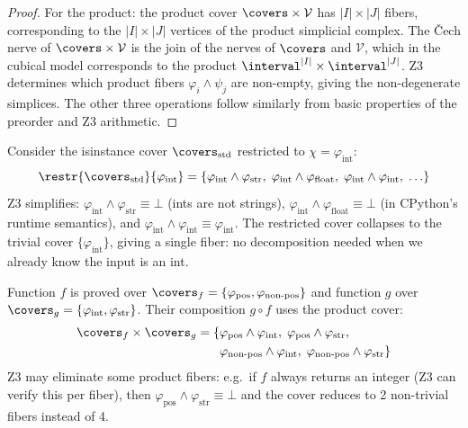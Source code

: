 \begin{proof}
For the product: the product cover $\covers \times \mathcal{V}$ has
$|I| \times |J|$ fibers, corresponding to the $|I| \times |J|$ vertices
of the product simplicial complex.  The \v{C}ech nerve of
$\covers \times \mathcal{V}$ is the join of the nerves of $\covers$ and
$\mathcal{V}$, which in the cubical model corresponds to the product
$\interval^{|I|} \times \interval^{|J|}$.  Z3 determines which product
fibers $\varphi_i \wedge \psi_j$ are non-empty, giving the non-degenerate
simplices.  The other three operations follow similarly from basic
properties of the preorder and Z3 arithmetic.
\end{proof}

\begin{example}
\label{ex:cover-restriction}
Consider the isinstance cover $\covers_{\mathrm{std}}$ restricted to
$\chi = \varphi_{\mathrm{int}}$:
\[
  \restr{\covers_{\mathrm{std}}}{\varphi_{\mathrm{int}}}
  = \{\varphi_{\mathrm{int}} \wedge \varphi_{\mathrm{str}},\;
    \varphi_{\mathrm{int}} \wedge \varphi_{\mathrm{float}},\;
    \varphi_{\mathrm{int}} \wedge \varphi_{\mathrm{int}},\;\ldots\}
\]
Z3 simplifies: $\varphi_{\mathrm{int}} \wedge \varphi_{\mathrm{str}} \equiv
\bot$ (ints are not strings), $\varphi_{\mathrm{int}} \wedge
\varphi_{\mathrm{float}} \equiv \bot$ (in CPython's runtime semantics),
and $\varphi_{\mathrm{int}} \wedge \varphi_{\mathrm{int}} \equiv
\varphi_{\mathrm{int}}$.  The restricted cover collapses to the trivial
cover $\{\varphi_{\mathrm{int}}\}$, giving a single fiber: no
decomposition needed when we already know the input is an int.
\end{example}

\begin{example}
\label{ex:product-cover}
Function $f$ is proved over
$\covers_f = \{\varphi_{\mathrm{pos}}, \varphi_{\mathrm{non\mathchar`-pos}}\}$
and function $g$ over
$\covers_g = \{\varphi_{\mathrm{int}}, \varphi_{\mathrm{str}}\}$.
Their composition $g \circ f$ uses the product cover:
\begin{align*}
\covers_f \times \covers_g =
  \{&\varphi_{\mathrm{pos}} \wedge \varphi_{\mathrm{int}},\;
    \varphi_{\mathrm{pos}} \wedge \varphi_{\mathrm{str}},\\
    &\varphi_{\mathrm{non\mathchar`-pos}} \wedge \varphi_{\mathrm{int}},\;
    \varphi_{\mathrm{non\mathchar`-pos}} \wedge \varphi_{\mathrm{str}}\}
\end{align*}
Z3 may eliminate some product fibers: e.g.\ if $f$ always returns an
integer (Z3 can verify this per fiber), then
$\varphi_{\mathrm{pos}} \wedge \varphi_{\mathrm{str}} \equiv \bot$ and
the cover reduces to 2 non-trivial fibers instead of 4.
\end{example}


